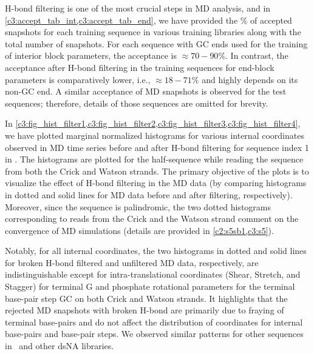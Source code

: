H-bond filtering is one of the most crucial steps in MD analysis, and in \cref{c3:accept_tab_int,c3:accept_tab_end}, we have provided the \% of accepted snapshots for each training sequence in various training libraries along with the total number of snapshots.
For each sequence with GC ends used for the training of interior block parameters, the acceptance is $\approx 70-90\%$.
In contrast, the acceptance after H-bond filtering in the training sequences for end-block parameters is comparatively lower, i.e., $\approx 18-71 \%$ and highly depends on its non-GC end.
A similar acceptance of MD snapshots is observed for the test sequences; therefore, details of those sequences are omitted for brevity.

In \cref{c3:fig_hist_filter1,c3:fig_hist_filter2,c3:fig_hist_filter3,c3:fig_hist_filter4}, we have plotted marginal normalized histograms for various internal coordinates observed in MD time series before and after H-bond filtering for sequence index 1 in \Lbdna. 
The histograms are plotted for the half-sequence while reading the sequence from both the Crick and Watson strands.
The primary objective of the plots is to visualize the effect of H-bond filtering in the MD data (by comparing histograms in dotted and solid lines for MD data before and after filtering, respectively). 
Moreover, since the sequence is palindromic, the two dotted histograms corresponding to reads from the Crick and the Watson strand comment on the convergence of MD simulations (details are provided in \cref{c2:s5sb1,c3:s5}).

Notably, for all internal coordinates, the two histograms in dotted and solid lines for broken H-bond filtered and unfiltered MD data, respectively, are indistinguishable except for intra-translational coordinates (Shear, Stretch, and Stagger) for terminal G and phosphate rotational parameters for the terminal base-pair step GC on both Crick and Watson strands. 
It highlights that the rejected MD snapshots with broken H-bond are primarily due to fraying of terminal base-pairs and do not affect the distribution of coordinates for internal base-pairs and base-pair steps.
We observed similar patterns for other sequences in \Lbdna \ and other dsNA libraries.


